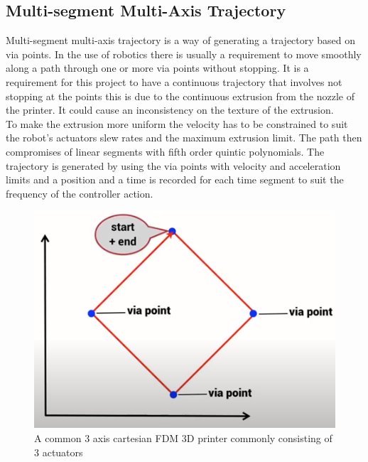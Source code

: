 \documentclass{UoNMCHA}
\numberwithin{equation}{section}
\begin{document}
	\subsection{Multi-segment Multi-Axis Trajectory}
	Multi-segment multi-axis trajectory is a way of generating a trajectory based on via points. In the use of robotics there is usually a requirement to move smoothly along a path through one or more via points without stopping. It is a requirement for this project to have a continuous trajectory that involves not stopping at the points this is due to the continuous extrusion from the nozzle of the printer. It could cause an inconsistency on the texture of the extrusion. \\
	To make the extrusion more uniform the velocity has to be constrained to suit the robot’s actuators slew rates and the maximum extrusion limit. The path then compromises of linear segments with fifth order quintic polynomials. The trajectory is generated by using the via points with velocity and acceleration limits and a position and a time is recorded for each time segment to suit the frequency of the controller action.
	
	\begin{figure}[H]
		\begin{center}
			\includegraphics[width=.8\linewidth]{figs/Picture10}
			\caption{A  common 3 axis cartesian FDM 3D printer commonly consisting of 3 actuators}
			\label{figs/Picture10}
		\end{center}
	\end{figure}
	
\end{document}
